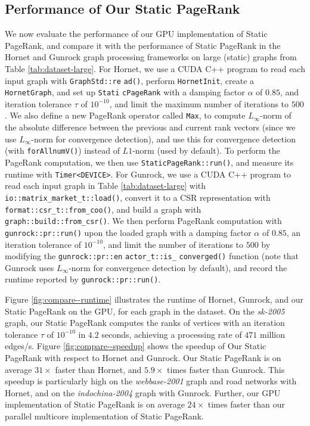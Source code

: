 \subsection{Performance of Our Static PageRank}
\label{sec:static-comparison}



We now evaluate the performance of our GPU implementation of Static PageRank, and compare it with the performance of Static PageRank in the Hornet \cite{busato2018hornet} and Gunrock \cite{wang2016gunrock} graph processing frameworks on large (static) graphs from Table \ref{tab:dataset-large}. For Hornet, we use a CUDA C++ program to read each input graph with \texttt{GraphStd::re} \texttt{ad()}, perform \texttt{HornetInit}, create a \texttt{HornetGraph}, and set up \texttt{Stati} \texttt{cPageRank} with a damping factor $\alpha$ of $0.85$, and iteration tolerance $\tau$ of $10^{-10}$, and limit the maximum number of iterations to $500$. We also define a new PageRank operator called \texttt{Max}, to compute $L_\infty$-norm of the absolute difference between the previous and current rank vectors (since we use $L_\infty$-norm for convergence detection), and use this for convergence detection (with \texttt{forAllnumV()}) instead of $L1$-norm (used by default). To perform the PageRank computation, we then use \texttt{StaticPageRank::run()}, and measure its runtime with \texttt{Timer<DEVICE>}. For Gunrock, we use a CUDA C++ program to read each input graph in Table \ref{tab:dataset-large} with \texttt{io::matrix\_market\_t::load()}, convert it to a CSR representation with \texttt{format::csr\_t::from\_coo()}, and build a graph with \texttt{graph::build::from\_csr()}. We then perform PageRank computation with \texttt{gunrock::pr::run()} upon the loaded graph with a damping factor $\alpha$ of $0.85$, an iteration tolerance of $10^{-10}$, and limit the number of iterations to $500$ by modifying the \texttt{gunrock::pr::en} \texttt{actor\_t::is\_} \texttt{converged()} function (note that Gunrock uses $L_\infty$-norm for convergence detection by default), and record the runtime reported by \texttt{gunrock::pr::run()}.

Figure \ref{fig:compare--runtime} illustrates the runtime of Hornet, Gunrock, and our Static PageRank on the GPU, for each graph in the dataset. On the \textit{sk-2005} graph, our Static PageRank computes the ranks of vertices with an iteration tolerance $\tau$ of $10^{-10}$ in $4.2$ seconds, achieving a processing rate of $471$ million edges/s. Figure \ref{fig:compare--speedup} shows the speedup of Our Static PageRank with respect to Hornet and Gunrock. Our Static PageRank is on average $31\times$ faster than Hornet, and $5.9\times$ times faster than Gunrock. This speedup is particularly high on the \textit{webbase-2001} graph and road networks with Hornet, and on the \textit{indochina-2004} graph with Gunrock. Further, our GPU implementation of Static PageRank is on average $24\times$ times faster than our parallel multicore implementation of Static PageRank.




